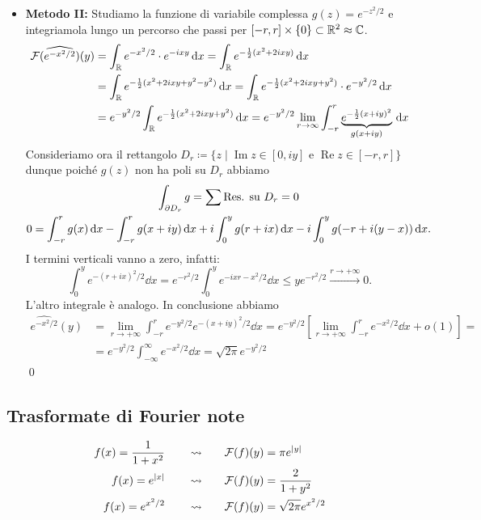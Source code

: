 \begin{itemize}
	\item \textbf{Metodo II:} Studiamo la funzione di variabile complessa $g(z) = e^{-z^2/2}$ e integriamola lungo un percorso che passi per $[-r, r] \times \{ 0 \} \subset \mathbb R^2 \approx \mathbb C$.
		$$
		\begin{aligned}
			\mathcal F(\widehat{e^{-x^2/2}})(y) 
			&= \int_\mathbb R e^{-x^2 / 2} \cdot e^{-ixy} \,\mathrm{d} x
			= \int_\mathbb R e^{-\frac{1}{2}(x^2 + 2ixy)} \,\mathrm{d} x \\
			&= \int_\mathbb R e^{-\frac{1}{2}(x^2 + 2ixy + y^2 - y^2)} \,\mathrm{d} x 
			= \int_\mathbb R e^{-\frac{1}{2}(x^2 + 2ixy + y^2)} \cdot e^{-y^2 / 2} \,\mathrm{d} x \\
			&= e^{-y^2 / 2} \int_\mathbb R e^{-\frac{1}{2}(x^2 + 2ixy + y^2)} \,\mathrm{d} x 
			= e^{-y^2 / 2} \lim_{r \to \infty} \int_{-r}^r \underbrace{e^{-\frac{1}{2}(x + iy)^2}}_{g(x + iy)} \,\mathrm{d} x
		\end{aligned}
		$$
		Consideriamo ora il rettangolo $D_r \coloneqq \{ z \mid \operatorname{Im} z \in [0, iy] \text{ e } \operatorname{Re} z \in [-r, r] \}$ dunque poiché $g(z)$ non ha poli su $D_r$ abbiamo
		$$
		\begin{gathered}
			\int_{\partial D_r} g = \sum \text{Res. su $D_r$} = 0 \\
			0 = \int_{-r}^r g(x) \,\mathrm{d} x - \int_{-r}^r g(x + iy) \,\mathrm{d} x 
			+ i \int_{0}^{y} g(r + ix) \,\mathrm{d} x - i\int_{0}^{y} g(-r + i(y-x)) \,\mathrm{d} x.
		\end{gathered}
		$$
		I termini verticali vanno a zero, infatti:
		$$
			\int_0^y e^{-(r+ix)^2 / 2} \dd x
			= e^{-r^2 / 2} \int_0^y e^{-ixr - x^2/2} \dd x \leq y e^{-r^2 / 2} \xrightarrow{r \to +\infty} 0.
		$$
		L'altro integrale è analogo. In conclusione abbiamo
		$$
		\begin{aligned}
			\hat{e^{-x^2 / 2}} (y) 
			&= \lim_{r \to +\infty} \int_{-r}^r e^{-y^2 / 2} e^{-(x + iy)^2 / 2} \dd x 
			= e^{-y^2 / 2} \left[ \lim_{r \to +\infty} \int_{-r}^r e^{-x^2 / 2} \dd x + o(1) \right] = \\
			&= e^{-y^2 / 2} \int_{-\infty}^\infty e^{-x^2 / 2} \dd x = \sqrt{2\pi} e^{-y^2 / 2} 
		\end{aligned}
		$$
		\qed

\end{itemize}

\subsection{Trasformate di Fourier note}

\begin{align*}
	f(x) = \frac{1}{1+x^2} \qquad \leadsto \qquad & \mathcal{F}(f)(y) = \pi e^{|y|} \\
	f(x) = e^{|x|}         \qquad \leadsto \qquad & \mathcal{F}(f)(y) = \frac{2}{1+y^2} \\
	f(x) = e^{x^2/2}       \qquad \leadsto \qquad & \mathcal{F}(f)(y) = \sqrt{2\pi} e^{x^2/2}
\end{align*}
